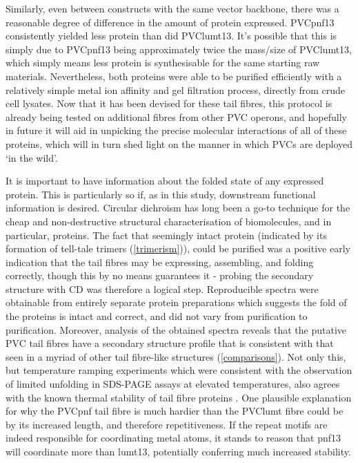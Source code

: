 Similarly, even between constructs with the same vector backbone, there was a reasonable degree of difference in the amount of protein expressed. PVCpnf13 consistently yielded less protein than did PVClumt13. It's possible that this is simply due to PVCpnf13 being approximately twice the mass/size of PVClumt13, which simply means less protein is synthesisable for the same starting raw materials. Nevertheless, both proteins were able to be purified efficiently with a relatively simple metal ion affinity and gel filtration process, directly from crude cell lysates. Now that it has been devised for these tail fibres, this protocol is already being tested on additional fibres from other PVC operons, and hopefully in future it will aid in unpicking the precise molecular interactions of all of these proteins, which will in turn shed light on the manner in which PVCs are deployed `in the wild'.

It is important to have information about the folded state of any expressed protein. This is particularly so if, as in this study, downstream functional information is desired. Circular dichroism has long been a go-to technique for the cheap and non-destructive structural characterisation of biomolecules, and in particular, proteins. The fact that seemingly intact protein (indicated by its formation of tell-tale trimers (\vref{trimerism})), could be purified was a positive early indication that the tail fibres may be expressing, assembling, and folding correctly, though this by no means guarantees it - probing the secondary structure with CD was therefore a logical step. Reproducible spectra were obtainable from entirely separate protein preparations which  suggests the fold of the proteins is intact and correct, and did not vary from purification to purification. Moreover, analysis of the obtained spectra reveals that the putative PVC tail fibres have a secondary structure profile that is consistent with that seen in a myriad of other tail fibre-like structures (\vref{comparisons}). Not only this, but temperature ramping experiments which were consistent with the observation of limited unfolding in SDS-PAGE assays at elevated temperatures, also agrees with the known thermal stability of tail fibre proteins \citep{Papanikolopoulou2004a, Papanikolopoulou2008, Gazit2008}. One plausible explanation for why the PVCpnf tail fibre is much hardier than the PVClumt fibre could be by its increased length, and therefore repetitiveness. If the repeat motifs are indeed responsible for coordinating metal atoms, it stands to reason that pnf13 will coordinate more than lumt13, potentially conferring much increased stability.

